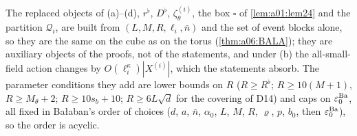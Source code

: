 The replaced objects of (a)--(d), $r^\flat$, $D^\flat$, $\zeta^{(i)}_\theta$, the box $\square$ of \cref{lem:a01:lem24} and the partition $\mathcal Q_i$, are built from $(L,M,R,\ell_i,\bar n)$ and the set of event blocks alone, so they are the same on the cube as on the torus (\cref{thm:a06:BALA}); they are auxiliary objects of the proofs, not of the statements, and under (b) the all-small-field action changes by $O(\ell_i^\kappa)|X^{(i)}|$, which the statements absorb. The parameter conditions they add are lower bounds on $R$ ($R\ge R^\flat$; $R\ge10(M+1)$, $R\ge M_\theta+2$; $R\ge10s_b+10$; $R\ge6L\sqrt d$ for the covering of D14) and caps on $\varepsilon_0^{\mathrm{Ba}}$, all fixed in Ba{\l}aban's order of choices ($d$, $a$, $\bar n$, $\alpha_0$, $L$, $M$, $R$, $\varrho$, $p$, $b_0$, then $\varepsilon_0^{\mathrm{Ba}}$), so the order is acyclic.
